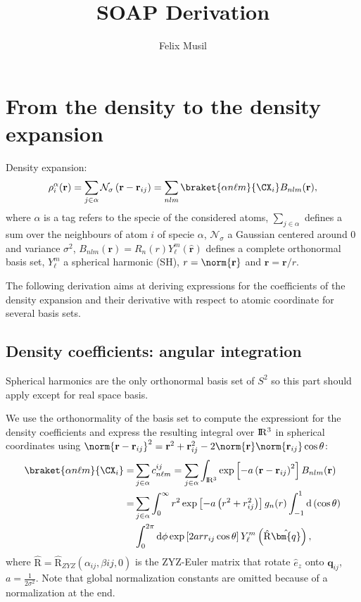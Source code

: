 \documentclass[
journal=jctcce, %
manuscript=article, layout=onecolumn]{achemso}
\author{Felix Musil}
\title[]
{SOAP Derivation}
\begin{document}
\section{From the density to the density expansion}
Density expansion:
\begin{equation}
\rho^{\alpha}_i(\mathbf{r})=\sum_{j\in \alpha} \mathcal{N}_{\sigma}\left(\mathbf{r}-\mathbf{r}_{ij}\right) = 
\sum_{nlm} \braket{\alpha n \ell m}{\CX_i} B_{nlm}(\mathbf{r}), 
\end{equation}
where $\alpha$ is a tag refers to the specie of the considered atoms, $\sum_{j \in \alpha}$ defines a sum over the neighbours of atom $i$ of specie $\alpha$, $\mathcal{N}_{\sigma}$ a Gaussian centered around $0$ and variance $\sigma^2$, $B_{nlm}(\mathbf{r}) = R_n(r) Y_{\ell}^m(\hat{\mathbf{r}})$  defines a complete orthonormal basis set, $Y_{\ell}^m$ a spherical harmonic (SH),  $r=\norm{\mathbf{r}}$ and $\hat{\mathbf{r}}=\mathbf{r}/r$.

The following derivation aims at deriving expressions for the coefficients of the density expansion and their derivative with respect to atomic coordinate for several basis sets.

\subsection{Density coefficients: angular integration}
Spherical harmonics are the only orthonormal basis set of $S^2$ so this part should apply except for real space basis.


We use the orthonormality of the basis set to compute the expressiont for the density coefficients and express the resulting integral over $\rm I\!R^3$ in spherical coordinates using $\norm{\mathbf{r}-\mathbf{r}_{ij}}^2=\mathbf{r}^2+\mathbf{r}_{ij}^2-2\norm{\mathbf{r}}\norm{\mathbf{r}_{ij}}\cos{\theta}$:
\begin{equation}
\begin{split}
\braket{\alpha n \ell m}{\CX_i}=& \sum_{j \in \alpha} c^{ij}_{n \ell m} = \sum_{j \in \alpha} \int_{\rm I\!R^3} \exp\left[-a\left(\mathbf{r}-\mathbf{r}_{ij}\right)^2\right]B_{nlm}(\mathbf{r})\\
=&\sum_{j \in \alpha} \int_{0}^{\infty}r^2  \exp\left[-a\left(r^2+r_{ij}^2\right)\right] g_n(r) \int_{-1}^{1}\mathrm{d}\left(\cos{\theta}\right) \\ 
& \int_0^{2\pi}\mathrm{d}\phi \exp\left[2arr_{ij}\cos{\theta}\right]Y_{\ell}^{m}\left(\hat{\mathrm{R}}\hat{\bm{q}}\right),\\
\end{split}
\end{equation}
where $\hat{\mathrm{R}} = \hat{\mathrm{R}}_{ZYZ}\left(\alpha_{ij},\beta{ij},0\right)$ is the ZYZ-Euler matrix that rotate $\hat{e}_z$ onto $\bm{q}_{ij}$, $a=\frac{1}{2\sigma^2}$. Note that global normalization constants are omitted because of a normalization at the end.
\end{document}

